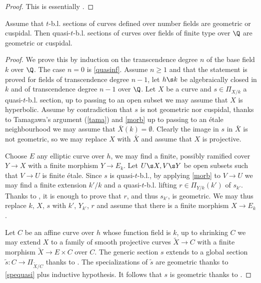 \begin{proof}
    This is essentially \cite[Proposition 2.8 (iv)]{tam97}.
\end{proof}

\begin{proposition}
\notready\label{nffg}
	Assume that $t$-b.l. sections of curves defined over number fields are geometric or cuspidal. Then quasi-$t$-b.l. sections of curves over fields of finite type over $\Q$ are geometric or cuspidal.
	\begin{proof}
		We prove this by induction on the transcendence degree $n$ of the base field $k$ over $\Q$. The case $n=0$ is \autoref{quasinf}. Assume $n \ge 1$ and that the statement is proved for fields of transcendence degree $n-1$, let $h\s k$ be algebraically closed in $k$ and of transcendence degree $n-1$ over $\Q$. Let $X$ be a curve and $s\in\Pi_{X/k}$ a quasi-$t$-b.l. section, up to passing to an open subset we may assume that $X$ is hyperbolic. Assume by contradiction that $s$ is not geometric nor cuspidal, thanks to Tamagawa's argument (\autoref{tama}) and \autoref{morb} up to passing to an étale neighbourhood we may assume that $\bar{X}(k)=\emptyset$. Clearly the image in $s$ in $\bar{X}$ is not geometric, so we may replace $X$ with $\bar{X}$ and assume that $X$ is projective.

		Choose $E$ any elliptic curve over $h$, we may find a finite, possibly ramified cover $Y\to X$ with a finite morphism $Y\to E_{k}$. Let $U\s X,V\s Y$ be open subsets such that $V\to U$ is finite étale. Since $s$ is quasi-$t$-b.l., by applying \autoref{morb} to $V\to U$ we may find a finite extension $k'/k$ and a quasi-$t$-b.l. lifting $r\in\Pi_{Y/k}(k')$ of $s_{k'}$. Thanks to \cite[Lemma 6.5, Theorem 7.2]{anab}, it is enough to prove that $r$, and thus $s_{k'}$, is geometric. We may thus replace $k$, $X$, $s$ with $k'$, $Y_{k'}$, $r$ and assume that there is a finite morphism $X\to E_{k}$.

		Let $C$ be an affine curve over $h$ whose function field is $k$, up to shrinking $C$ we may extend $X$ to a family of smooth projective curves $\tilde{X}\to C$ with a finite morphism $\tilde{X}\to E\times C$ over $C$. The generic section $s$ extends to a global section $\tilde{s}:C\to\Pi_{\tilde{X}/C}$ thanks to \cite[Corollary 3.4]{scfg}. The specializations of $\tilde{s}$ are geometric thanks to \autoref{spequasi} plus inductive hypothesis. It follows that $s$ is geometric thanks to \cite[Definition 4.1, Corollary 4.9]{scfg}.
	\end{proof}
\end{proposition}
